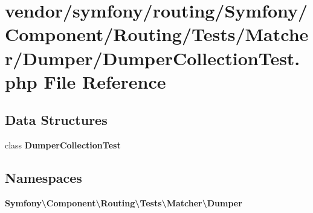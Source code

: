 \section{vendor/symfony/routing/\+Symfony/\+Component/\+Routing/\+Tests/\+Matcher/\+Dumper/\+Dumper\+Collection\+Test.php File Reference}
\label{_dumper_collection_test_8php}
\subsection*{Data Structures}
\begin{DoxyCompactItemize}
\item 
class {\bf Dumper\+Collection\+Test}
\end{DoxyCompactItemize}
\subsection*{Namespaces}
\begin{DoxyCompactItemize}
\item 
 {\bf Symfony\textbackslash{}\+Component\textbackslash{}\+Routing\textbackslash{}\+Tests\textbackslash{}\+Matcher\textbackslash{}\+Dumper}
\end{DoxyCompactItemize}
